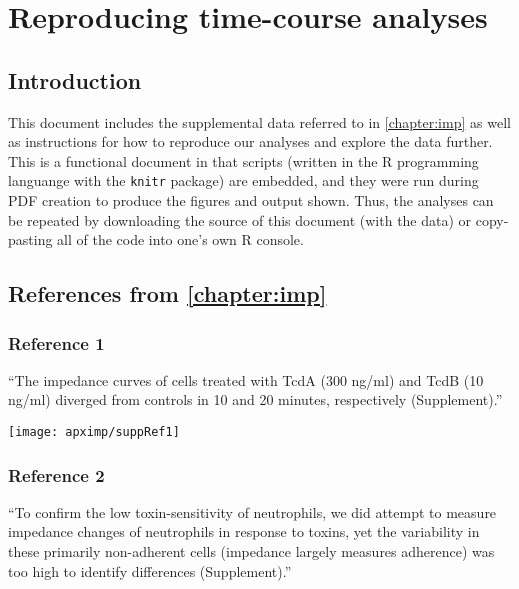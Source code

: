 \chapter[Reproducing time-course analyses]{Reproducing time-course analyses}


\section{Introduction}\label{S:Intro}

This document includes the supplemental data referred to in \ref{chapter:imp}
as well as instructions for how to reproduce our analyses and explore the
data further.
This is a functional document in that scripts (written in the
R programming languange with the \texttt{knitr} package) are embedded, and they were run during
PDF creation to produce the figures and output shown. Thus, the analyses can
be repeated by downloading the source of this document (with the data) or copy-pasting
all of the code into one's own R console.

\section{ References from \ref{chapter:imp} }\label{S:ReFig}

\subsection{ Reference 1 }

``The impedance curves of cells treated with TcdA (300 ng/ml) 
and TcdB (10 ng/ml) diverged from controls in 10 and 20 minutes, 
respectively (Supplement).''



\singlespacing \begin{knitrout}
\color{fgcolor}
\texttt{[image: apximp/suppRef1]} 
\end{knitrout} \doublespacing


\subsection{ Reference 2 }

``To confirm the low toxin-sensitivity of neutrophils, we did attempt to 
measure impedance changes of neutrophils in response to toxins, yet 
the variability in these primarily non-adherent cells (impedance 
largely measures adherence) was too high to identify 
differences (Supplement).''


